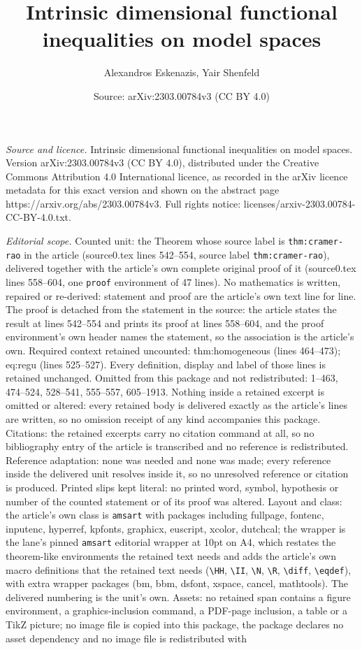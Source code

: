 \documentclass[10pt,a4paper]{amsart}
\title[Intrinsic dimensional functional inequalities on model space]{Intrinsic dimensional functional inequalities on model spaces}
\author{Alexandros Eskenazis, Yair Shenfeld}
\date{Source: arXiv:2303.00784v3 (CC BY 4.0)}
\begin{document}
\maketitle

\noindent\emph{Source and licence.} Intrinsic dimensional functional inequalities on model spaces. Version arXiv:2303.00784v3 (CC BY 4.0), distributed under the Creative Commons Attribution 4.0 International licence, as recorded in the arXiv licence metadata for this exact version and shown on the abstract page https://arxiv.org/abs/2303.00784v3. Full rights notice: licenses/arxiv-2303.00784-CC-BY-4.0.txt.\par\smallskip

\noindent\textit{Editorial scope.} Counted unit: the Theorem whose source label is \texttt{thm:cramer-rao} in the article (source0.tex lines 542--554, source label \texttt{thm:cramer-rao}), delivered together with the article's own complete original proof of it (source0.tex lines 558--604, one \texttt{proof} environment of 47 lines). No mathematics is written, repaired or re-derived: statement and proof are the article's own text line for line. The proof is detached from the statement in the source: the article states the result at lines 542--554 and prints its proof at lines 558--604, and the proof environment's own header names the statement, so the association is the article's own. Required context retained uncounted: thm:homogeneous (lines 464--473); eq:regu (lines 525--527). Every definition, display and label of those lines is retained unchanged. Omitted from this package and not redistributed: 1--463, 474--524, 528--541, 555--557, 605--1913. Nothing inside a retained excerpt is omitted or altered: every retained body is delivered exactly as the article's lines are written, so no omission receipt of any kind accompanies this package. Citations: the retained excerpts carry no citation command at all, so no bibliography entry of the article is transcribed and no reference is redistributed. Reference adaptation: none was needed and none was made; every reference inside the delivered unit resolves inside it, so no unresolved reference or citation is produced. Printed slips kept literal: no printed word, symbol, hypothesis or number of the counted statement or of its proof was altered. Layout and class: the article's own class is \texttt{amsart} with packages including fullpage, fontenc, inputenc, hyperref, kpfonts, graphicx, euscript, xcolor, dutchcal; the wrapper is the lane's pinned \texttt{amsart} editorial wrapper at 10pt on A4, which restates the theorem-like environments the retained text needs and adds the article's own macro definitions that the retained text needs (\texttt{\textbackslash HH}, \texttt{\textbackslash II}, \texttt{\textbackslash N}, \texttt{\textbackslash R}, \texttt{\textbackslash diff}, \texttt{\textbackslash eqdef}), with extra wrapper packages (bm, bbm, dsfont, xspace, cancel, mathtools). The delivered numbering is the unit's own. Assets: no retained span contains a figure environment, a graphics-inclusion command, a PDF-page inclusion, a table or a TikZ picture; no image file is copied into this package, the package declares no asset dependency and no image file is redistributed with 
\end{document}

